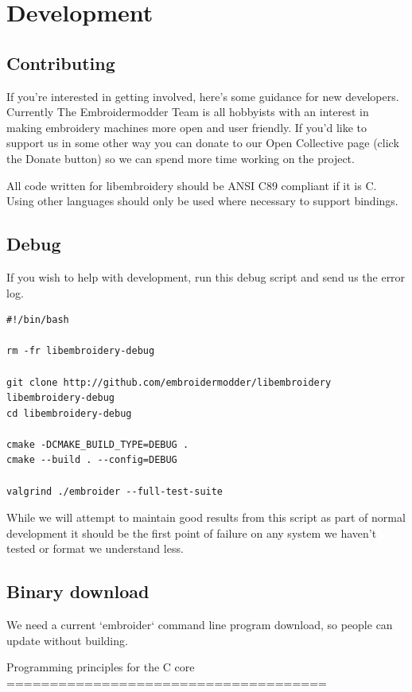 \documentclass[a4paper]{report}
\begin{document}
\section{Development}

\subsection{Contributing}

If you're interested in getting involved, here's some guidance
for new developers. Currently The Embroidermodder Team is all
hobbyists with an interest in making embroidery machines more
open and user friendly. If you'd like to support us in some other way
you can donate to our Open Collective page (click the Donate button) so
we can spend more time working on the project.

All code written for libembroidery should be ANSI C89 compliant
if it is C. Using other languages should only be used where
necessary to support bindings.

\subsection{Debug}

If you wish to help with development, run this debug script and send us the
error log.

\begin{lstlisting}
#!/bin/bash

rm -fr libembroidery-debug

git clone http://github.com/embroidermodder/libembroidery libembroidery-debug
cd libembroidery-debug

cmake -DCMAKE_BUILD_TYPE=DEBUG .
cmake --build . --config=DEBUG

valgrind ./embroider --full-test-suite
\end{lstlisting}

While we will attempt to maintain good results from this script as part of
normal development it should be the first point of failure on any system we
haven't tested or format we understand less.

\subsection{Binary download}

We need a current `embroider` command line program download, so people can update
without building.

Programming principles for the C core
=====================================
\end{document}

